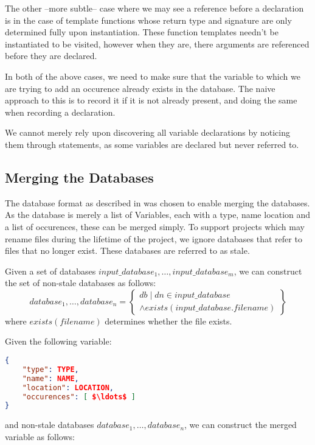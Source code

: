 The other --more subtle-- case where we may see a reference before a declaration
is in the case of template functions whose return type and signature are only
determined fully upon instantiation. These function templates needn't be
instantiated to be visited, however when they are, there arguments are
referenced before they are declared.

In both of the above cases, we need to make sure that the variable to which we
are trying to add an occurence already exists in the database. The naive
approach to this is to record it if it is not already present, and doing the
same when recording a declaration.

We cannot merely rely upon discovering all variable declarations by noticing
them through statements, as some variables are declared but never referred to.

\subsection{Merging the Databases}
\label{sec:dbmerge}

The database format as described in  was chosen to enable
merging the databases.
As the database is merely a list of Variables, each with a type, name location
and a list of occurences, these can be merged simply.
To support projects which may rename files during the lifetime of the project,
we ignore databases that refer to files that no longer exist. These databases
are referred to as stale.

Given a set of databases $input\_database_1, \ldots, input\_database_m$, we can
construct the set of non-stale databases as follows:
\begin{equation}
	database_1, \ldots, database_n = \left \{
		\substack {
			db \mid dn \in input\_database \\
			\land exists(input\_database.filename)
		}
	\right \}
\end{equation}
where $exists(filename)$ determines whether the file exists.

Given the following variable:
\begin{lstlisting}[mathescape, language=json, caption={Example Variable}]
{
	"type": TYPE,
	"name": NAME,
	"location": LOCATION,
	"occurences": [ $\ldots$ ]
}
\end{lstlisting}
and non-stale databases $database_1, \ldots, database_n$, we can construct the
merged variable as follows:

